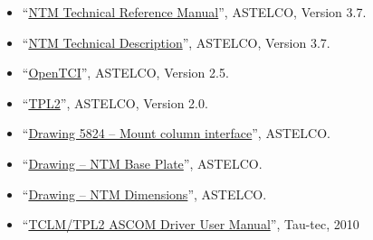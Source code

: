 \begin{flushleft}
\begin{itemize}
\item “\href{technical-manual/bibliography/astelco-mount-ntm-manual.pdf}{NTM Technical Reference Manual}”, ASTELCO, Version 3.7.
\item “\href{technical-manual/bibliography/astelco-mount-ntm-technical-description.pdf}{NTM Technical Description}”, ASTELCO, Version 3.7.
\item “\href{bibliography/astelco-opentci.pdf}{OpenTCI}”, ASTELCO, Version 2.5.
\item “\href{bibliography/astelco-tpl2.pdf}{TPL2}”, ASTELCO, Version 2.0.
\item “\href{bibliography/astelco-mount-drawing-5824.pdf}{Drawing 5824 -- Mount column interface}”, ASTELCO.
\item “\href{bibliography/astelco-mount-drawing-ntm-base-plate.pdf}{Drawing -- NTM Base Plate}”, ASTELCO.
\item “\href{bibliography/astelco-mount-drawing-ntm-dimensions.pdf}{Drawing -- NTM Dimensions}”, ASTELCO.
\item “\href{bibliography/tau-tec-ascom.pdf}{TCLM/TPL2 ASCOM Driver User Manual}”, Tau-tec, 2010
\end{itemize}
\end{flushleft}
